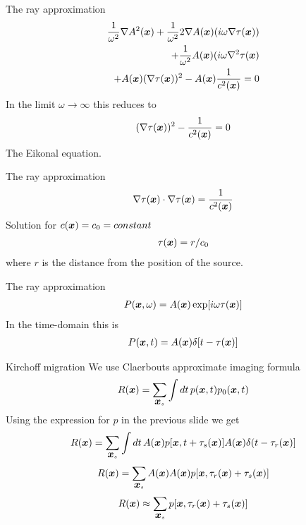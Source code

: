 \documentclass[xcolor=dvipsnames,notes]{beamer}
\begin{document}
\begin{frame}{The ray approximation}
\begin{eqnarray}
                             \frac{1}{\omega^2}\nabla A^2(\mbox{\boldmath $x$}) 
                              +  \frac{1}{\omega^2}2\nabla A(\mbox{\boldmath $x$})(i\omega\nabla\tau(\mbox{\boldmath $x$})) \nonumber\\
                              +  \frac{1}{\omega^2}A(\mbox{\boldmath $x$})(i\omega\nabla^2\tau(\mbox{\boldmath $x$})\nonumber\\      
                              +  A(\mbox{\boldmath $x$})(\nabla\tau(\mbox{\boldmath $x$}))^2-A(\mbox{\boldmath $x$})\frac{1}{c^2(\mbox{\boldmath $x$})} = 0\nonumber\\
\end{eqnarray}
In the limit $\omega \rightarrow \infty$ this reduces to
\begin{eqnarray}
                              (\nabla\tau(\mbox{\boldmath $x$}))^2-\frac{1}{c^2(\mbox{\boldmath $x$})} = 0
\end{eqnarray}
The Eikonal equation.
\end{frame}
\begin{frame}{The ray approximation}
\begin{eqnarray}
\nabla\tau(\mbox{\boldmath $x$}) \cdot \nabla\tau(\mbox{\boldmath $x$}) = \frac{1}{c^2(\mbox{\boldmath $x$})}
\end{eqnarray}
Solution for $c(\mbox{\boldmath $x$}) = c_0=constant$
\begin{eqnarray}
\tau(\mbox{\boldmath $x$}) = r/c_0
\end{eqnarray}
where $r$ is the distance from the position of the source.
\end{frame}
\begin{frame}{The ray approximation}
\begin{eqnarray}
P(\mbox{\boldmath $x$},\omega) = A(\mbox{\boldmath $x$}) \exp[i\omega\tau(\mbox{\boldmath $x$})]
\end{eqnarray}
In the time-domain this is
\begin{eqnarray}
P(\mbox{\boldmath $x$},t) = A(\mbox{\boldmath $x$}) \delta[t-\tau(\mbox{\boldmath $x$})]
\end{eqnarray}
\end{frame}
\begin{frame}{Kirchoff migration}
We use Claerbouts approximate imaging formula
\begin{eqnarray}
R(\mbox{\boldmath $x$}) = \sum_{\mbox{\boldmath $x$}_s} \int dt\, p(\mbox{\boldmath $x$},t)p_0(\mbox{\boldmath $x$},t)
\end{eqnarray}
Using the expression for $p$ in the
previous slide we get
\begin{eqnarray}
R(\mbox{\boldmath $x$}) = \sum_{\mbox{\boldmath $x$}_s} \int dt\, A(\mbox{\boldmath $x$})p[\mbox{\boldmath $x$},t+\tau_s(\mbox{\boldmath $x$})]A(\mbox{\boldmath $x$})\delta(t-\tau_r(\mbox{\boldmath $x$})]
\end{eqnarray}
\begin{eqnarray}
R(\mbox{\boldmath $x$}) = \sum_{\mbox{\boldmath $x$}_s} A(\mbox{\boldmath $x$})A(\mbox{\boldmath $x$}) p[\mbox{\boldmath $x$},\tau_r(\mbox{\boldmath $x$})+\tau_s(\mbox{\boldmath $x$})]
\end{eqnarray}
\begin{eqnarray}
R(\mbox{\boldmath $x$}) \approx \sum_{\mbox{\boldmath $x$}_s} p[\mbox{\boldmath $x$},\tau_r(\mbox{\boldmath $x$})+\tau_s(\mbox{\boldmath $x$})]
\end{eqnarray}
\end{frame}
\end{document}
